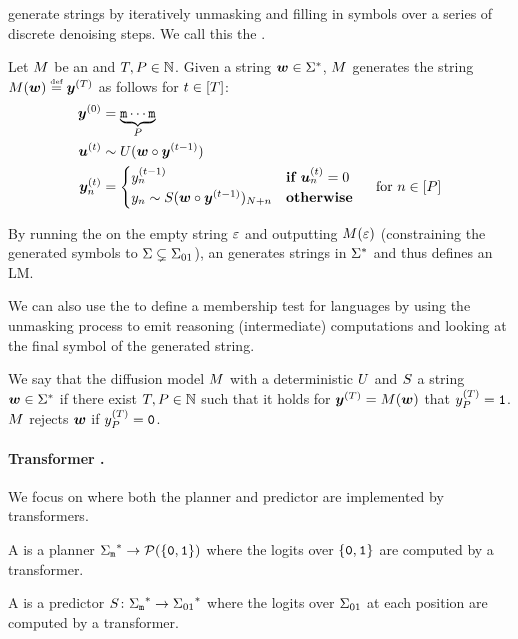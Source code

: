 \MDMsAcr generate strings by iteratively unmasking and filling in symbols over a series of discrete denoising steps.
We call this the .
\begin{definition}
   Let ${M}$ be an \MDMAcr and ${T}, {P} \in {{\mathbb{N}}}$. 
   Given a string ${{\boldsymbol{w}}} \in {{{{{{\Sigma}}^{*}}}}}$, ${M}$ generates the string  ${M}({{\boldsymbol{w}}}) \mathrel{\stackrel{\textnormal{\tiny def}}{=}} {{\boldsymbol{y}}}^{({T})}$ as follows for $t \in {\left[ {T}\right]}$:
   \begin{subequations}
      \begin{align}
         {{\boldsymbol{y}}}^{(0)} &= \underbrace{{\texttt{m}} \cdots {\texttt{m}}}_{{P}} \\
         {{\boldsymbol{u}}}^{(t)} &\sim {U}({{\boldsymbol{w}}} \circ {{\boldsymbol{y}}}^{(t - 1)}) \\
         {{\boldsymbol{y}}}^{(t)}_{{n}} &=
         \begin{cases}
            {{y}}^{(t - 1)}_{{n}} & \textbf{if } {{\boldsymbol{u}}}^{(t)}_{{n}} = 0 \\
            {{y}}_{{n}} \sim {S}({{\boldsymbol{w}}} \circ {{\boldsymbol{y}}}^{(t - 1)})_{{{N}} + {{n}}} & \textbf{otherwise }
         \end{cases} \text{\quad for } {{n}} \in {\left[ {P}\right]}
      \end{align}
   \end{subequations}
\end{definition}
By running the \MDMAcr on the empty string ${{\varepsilon}}$ and outputting ${M}({{\varepsilon}})$ (constraining the generated symbols to ${{\Sigma}} \subsetneq {{{\Sigma}}_{01}}$), an \MDMAcr generates strings in ${{{{{{\Sigma}}^{*}}}}}$ and thus defines an LM.

We can also use the \MDMAcr to define a membership test for languages by using the unmasking process to emit reasoning (intermediate) computations and looking at the final symbol of the generated string.
\begin{definition}
   We say that the diffusion model ${M}$ with a deterministic ${U}$ and ${S}$  a string ${{\boldsymbol{w}}}\in {{{{{{\Sigma}}^{*}}}}}$ if there exist ${T}, {P} \in {{\mathbb{N}}}$ such that it holds for ${{\boldsymbol{y}}}^{({T})} = {M}({{\boldsymbol{w}}})$ that ${{y}}^{({T})}_{P} = {\texttt{1}}$. 
   ${M}$ rejects ${{\boldsymbol{w}}}$ if ${{y}}^{({T})}_{P} = {\texttt{0}}$. 
\end{definition}

\paragraph{Transformer \MDMsAcr.}
We focus on \MDMsAcr where both the planner and predictor are implemented by transformers.
\begin{definition}
   A  is a planner ${{{{{\Sigma}}_{{\texttt{m}}}}^{*}}} \to {{\mathcal{P}}}(\{{\texttt{0}}, {\texttt{1}}\})$ where the logits over $\{{\texttt{0}}, {\texttt{1}}\}$ are computed by a transformer.
   
   A  is a predictor ${S}\colon {{{{{\Sigma}}_{{\texttt{m}}}}^{*}}} \to {{{{{\Sigma}}_{01}}^{*}}}$ where the logits over ${{{\Sigma}}_{01}}$ at each position are computed by a transformer.
\end{definition}


